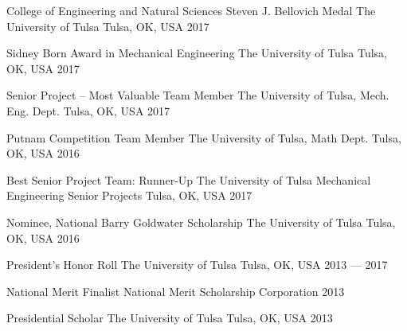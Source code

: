 \begin{cvhonors}

  \cvhonor
    {College of Engineering and Natural Sciences Steven J. Bellovich Medal} %
    {The University of Tulsa} %
    {Tulsa, OK, USA} %
    {2017} %

  \cvhonor
    {Sidney Born Award in Mechanical Engineering} %
    {The University of Tulsa} %
    {Tulsa, OK, USA} %
    {2017} %

  \cvhonor
    {Senior Project -- Most Valuable Team Member} %
    {The University of Tulsa, Mech. Eng. Dept.} %
    {Tulsa, OK, USA} %
    {2017} %
    
\cvhonor
	{Putnam Competition Team Member} %
	{The University of Tulsa, Math Dept.} %
	{Tulsa, OK, USA} %
	{2016} %


  \cvhonor
    {Best Senior Project Team: Runner-Up} %
    {The University of Tulsa Mechanical Engineering Senior Projects} %
    {Tulsa, OK, USA} %
    {2017} %

  \cvhonor
    {Nominee, National Barry Goldwater Scholarship} %
    {The University of Tulsa} %
    {Tulsa, OK, USA} %
    {2016} %
    
\cvhonor
	{President's Honor Roll} %
	{The University of Tulsa} %
	{Tulsa, OK, USA} %
	{2013 --- 2017} %

\cvhonor
	{National Merit Finalist} %
	{National Merit Scholarship Corporation} %
	{} %
	{2013} %

\cvhonor
	{Presidential Scholar} %
	{The University of Tulsa} %
	{Tulsa, OK, USA} %
	{2013} %
\end{cvhonors}

